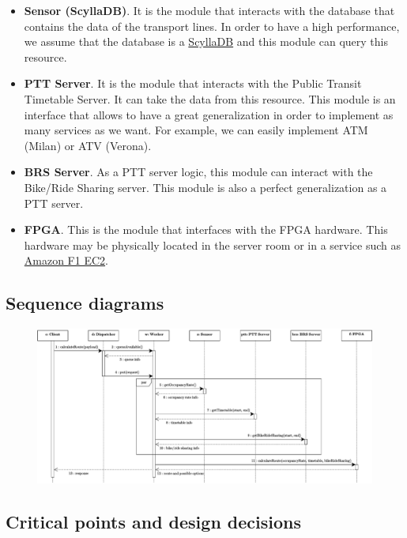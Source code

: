 \documentclass[a4paper]{article}
\begin{document}
\begin{itemize}
        \item \textbf{Sensor (ScyllaDB)}. It is the module that interacts with the database that contains the data of the transport lines. In order to have a high performance, we assume that the database is a \href{https://www.scylladb.com/product/technology/}{ScyllaDB} and this module can query this resource.

        \item \textbf{PTT Server}. It is the module that interacts with the Public Transit Timetable Server. It can take the data from this resource. This module is an interface that allows to have a great generalization in order to implement as many services as we want. For example, we can easily implement ATM (Milan) or ATV (Verona).
        
        \item \textbf{BRS Server}. As a PTT server logic, this module can interact with the Bike/Ride Sharing server. This module is also a perfect generalization as a PTT server.

        \item \textbf{FPGA}. This is the module that interfaces with the FPGA hardware. This hardware may be physically located in the server room or in a service such as \href{https://aws.amazon.com/ec2/instance-types/f1/}{Amazon F1 EC2}.
    \end{itemize}    

    \newpage

    \subsection{Sequence diagrams}

    \begin{figure}[!htp]
        \centering
        \includegraphics[width=\textwidth]{img/sequence-diagram-1.pdf}
    \end{figure}


    \newpage

    \subsection{Critical points and design decisions}\label{subsection: Critical points and design decisions}
\end{document}
